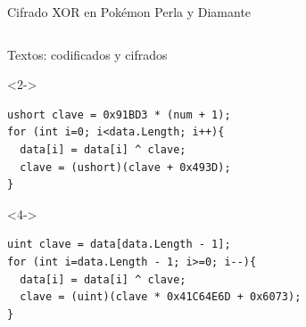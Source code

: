 \begin{frame}[fragile]{Cifrado XOR en Pokémon Perla y Diamante}
\begin{columns}
\begin{column}{0.75\textwidth}
    Textos: codificados y cifrados
    \begin{uncoverenv}<2->\begin{lstlisting}
ushort clave = 0x91BD3 * (num + 1);
for (int i=0; i<data.Length; i++){
  data[i] = data[i] ^ clave;
  clave = (ushort)(clave + 0x493D);
}
    \end{lstlisting}\end{uncoverenv}

    \begin{uncoverenv}<4->\begin{lstlisting}
uint clave = data[data.Length - 1];
for (int i=data.Length - 1; i>=0; i--){
  data[i] = data[i] ^ clave;
  clave = (uint)(clave * 0x41C64E6D + 0x6073);
}
    \end{lstlisting}\end{uncoverenv}
\end{column}

\begin{column}{0.25\textwidth}
    \vfill
\end{column}
\end{columns}
\end{frame}

